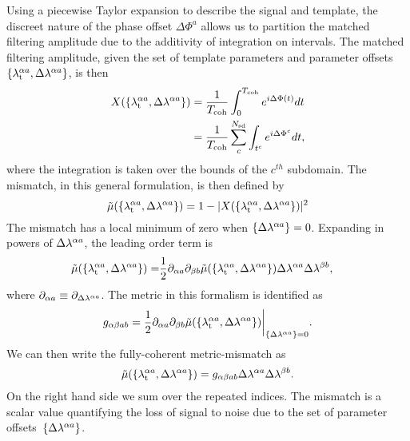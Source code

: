\documentclass[../full_thesis/full_thesis.tex]{subfiles}
\begin{document}
Using a piecewise Taylor expansion
to describe the signal and template, the discreet nature of the phase offset
$\Delta\Phi^{a}$ allows us to partition the matched filtering amplitude due to
the additivity of integration on intervals. The matched filtering amplitude,
given the set of template parameters and parameter offsets $\{{\lambda}_\textrm{t}^{\alpha a},
\Delta\lambda^{\alpha a}\}$, is then
\begin{align}
\begin{split}
X(\{{\lambda}_\textrm{t}^{\alpha a}, \Delta\lambda^{\alpha a}\}) & =
\frac{1}{T_{\mathrm{coh}}}\int_{0}^{T_{\mathrm{coh}}}e^{i \Delta \Phi(t)}dt  \\
& =  \frac{1}{T_{\mathrm{coh}}}\sum_{c}^{N_{\textrm{sd}}} \int_{t^{c}}e^{i \Delta \Phi^{c}}dt,
\end{split}
\end{align}
where the integration is taken over the bounds of the $c^{th}$ subdomain. The
mismatch, in this general formulation, is then defined by
\begin{equation}
\tilde{\mu}(\{{\lambda}_\textrm{t}^{\alpha a}, \Delta\lambda^{\alpha a}\}) =
 1 -  |X(\{{\lambda}_\textrm{t}^{\alpha a}, \Delta\lambda^{\alpha a}\})|^{2}
\end{equation}
The mismatch has a local minimum of zero when $\{\Delta\lambda^{\alpha a}\}=0$. Expanding in powers of
$\Delta\lambda^{\alpha a}$, the leading order term is
\begin{align}
\begin{split}
\tilde{\mu}(\{{\lambda}_\textrm{t}^{\alpha a}, \Delta\lambda^{\alpha a}\}) =
 & \frac{1}{2} \partial_{\alpha a} \partial_{\beta b}
                \tilde{\mu}(\{{\lambda}_\textrm{t}^{\alpha a}, \Delta\lambda^{\alpha a}\})
                \Delta\lambda^{\alpha a}\Delta\lambda^{\beta b},
\label{eqn: mismatch expansion}
\end{split}
\end{align}
where $\partial_{\alpha a} \equiv \partial_{\Delta\lambda^{\alpha a}}$.  The metric in
this formalism is identified as
\begin{equation}
g_{\alpha\beta ab} =
\frac{1}{2} \partial_{\alpha a} \partial_{\beta b}
            \tilde{\mu}(\{{\lambda}_\textrm{t}^{\alpha a}, \Delta\lambda^{\alpha a}\})
            \biggr\rvert_{\{\Delta\lambda^{\alpha a}\}=0}.
\end{equation}
We can then write the fully-coherent metric-mismatch as
\begin{equation}
\tilde{\mu}(\{{\lambda}_\textrm{t}^{\alpha a}, \Delta\lambda^{\alpha a}\}) =
 g_{\alpha\beta ab} \Delta\lambda^{\alpha a}\Delta\lambda^{\beta b}.
\label{eqn: mismatch}
\end{equation}
On the right hand side we sum over the repeated indices. The mismatch is a
scalar value quantifying the loss of signal to noise due to the set of
parameter offsets~$\{\Delta\lambda^{\alpha a}\}$.
\end{document}
